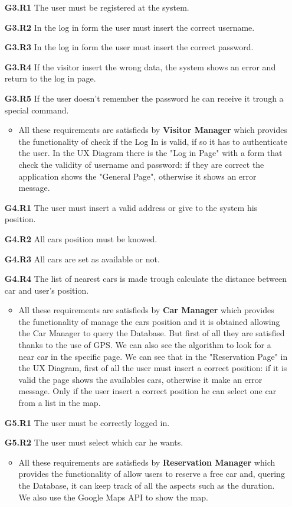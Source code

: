 \begin{itemize}
\item[\textbf{G3.R1}] The user must be registered at the system.
\item[\textbf{G3.R2}] In the log in form the user must insert the correct username.
\item[\textbf{G3.R3}] In the log in form the user must insert the correct password.
\item[\textbf{G3.R4}] If the visitor insert the wrong data, the system shows an error and return to the log in page.
\item[\textbf{G3.R5}] If the user doesn't remember the password he can receive it trough a special command.
\begin{itemize}
\item All these requirements are satisfieds by \textbf{Visitor Manager} which provides the functionality of check if the Log In is valid, if so it has to authenticate the user. In the UX Diagram there is the "Log in Page" with a form that check the validity of username and password: if they are correct the application shows the "General Page", otherwise it shows an error message.
\end{itemize}

\item[\textbf{G4.R1}] The user must insert a valid address or give to the system his position.
\item[\textbf{G4.R2}] All cars position must be knowed.
\item[\textbf{G4.R3}] All cars are set as available or not.
\item[\textbf{G4.R4}] The list of nearest cars is made trough calculate the distance between car and user's position.
\begin{itemize}
\item All these requirements are satisfieds by \textbf{Car Manager} which provides the functionality of manage the cars position and it is obtained allowing the Car Manager to query the Database. But first of all they are satisfied thanks to the use of GPS. We can also see the algorithm to look for a near car in the specific page. We can see that in the "Reservation Page" in the UX Diagram, first of all the user must insert a correct position: if it is valid the page shows the availables cars, otherwise it make an error message. Only if the user insert a correct position he can select one car from a list in the map.
\end{itemize}

\item[\textbf{G5.R1}] The user must be correctly logged in.
\item[\textbf{G5.R2}] The user must select which car he wants.
\begin{itemize}
\item All these requirements are satisfieds by \textbf{Reservation Manager} which provides the functionality of allow users to reserve a free car and, quering the Database, it can keep track of all the aspects such as the duration. We also use the Google Maps API to show the map.
\end{itemize}


\end{itemize}
